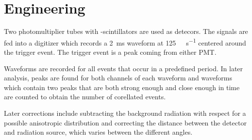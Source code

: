 \section{Engineering}
Two photomultiplier tubes with -scintillators are used as  detecors.
The signals are fed into a digitizer which records a \SI{2}{\ms} waveform at \SI{125}{\kilo\samples\per\second} centered around the trigger event.
The trigger event is a peak coming from either PMT.

Waveforms are recorded for all events that occur in a predefined period.
In later analysis, peaks are found for both channels of each waveform and waveforms which contain two peaks that are both strong enough and close enough in time are counted to obtain the number of corellated events.

Later corrections include subtracting the background radiation with respect for a possible anisotropic distribution and correcting the distance between the detector and radiation source, which varies between the different angles.
